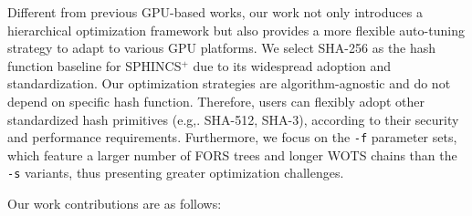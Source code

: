 \documentclass[10pt,conference]{IEEEtran}
\begin{document}
Different from previous GPU-based works, our work not only introduces a hierarchical optimization framework but also provides a more flexible auto-tuning strategy to adapt to various GPU platforms. We select SHA-256 as the hash function baseline for SPHINCS$^+$ due to its widespread adoption and standardization. Our optimization strategies are algorithm-agnostic and do not depend on specific hash function. Therefore, users can flexibly adopt other standardized hash primitives (e.g,. SHA-512, SHA-3), according to their security and performance requirements. Furthermore, we focus on the \texttt{-f} parameter sets, which feature a larger number of FORS trees and longer WOTS chains than the \texttt{-s} variants, thus presenting greater optimization challenges. 






Our work contributions are as follows:
\end{document}
